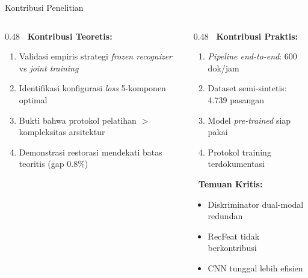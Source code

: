 \documentclass[aspectratio=169,10pt,t]{beamer}
\begin{document}
\begin{frame}{Kontribusi Penelitian}
    \begin{columns}[T]
        \begin{column}{0.48\textwidth}
            \textbf{\faBook~Kontribusi Teoretis:}
            \begin{enumerate}
                \item Validasi empiris strategi \textit{frozen recognizer} vs \textit{joint training}
                \item Identifikasi konfigurasi \textit{loss} 5-komponen optimal
                \item Bukti bahwa protokol pelatihan $>$ kompleksitas arsitektur
                \item Demonstrasi restorasi mendekati batas teoritis (gap 0.8\%)
            \end{enumerate}
        \end{column}
        \begin{column}{0.48\textwidth}
            \textbf{\faTools~Kontribusi Praktis:}
            \begin{enumerate}
                \item \textit{Pipeline end-to-end}: 600 dok/jam
                \item Dataset semi-sintetis: 4.739 pasangan
                \item Model \textit{pre-trained} siap pakai
                \item Protokol training terdokumentasi
            \end{enumerate}
            
            \vspace{0.5em}
            \textbf{\faLightbulb~Temuan Kritis:}
            \begin{itemize}
                \item Diskriminator dual-modal redundan
                \item RecFeat tidak berkontribusi
                \item CNN tunggal lebih efisien
            \end{itemize}
        \end{column}
    \end{columns}
\end{frame}
\end{document}
